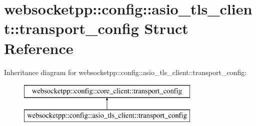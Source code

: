 \hypertarget{structwebsocketpp_1_1config_1_1asio__tls__client_1_1transport__config}{}\section{websocketpp\+:\+:config\+:\+:asio\+\_\+tls\+\_\+client\+:\+:transport\+\_\+config Struct Reference}
\label{structwebsocketpp_1_1config_1_1asio__tls__client_1_1transport__config}
Inheritance diagram for websocketpp\+:\+:config\+:\+:asio\+\_\+tls\+\_\+client\+:\+:transport\+\_\+config\+:\begin{figure}[H]
\begin{center}
\leavevmode
\includegraphics[height=2.000000cm]{structwebsocketpp_1_1config_1_1asio__tls__client_1_1transport__config}
\end{center}
\end{figure}
